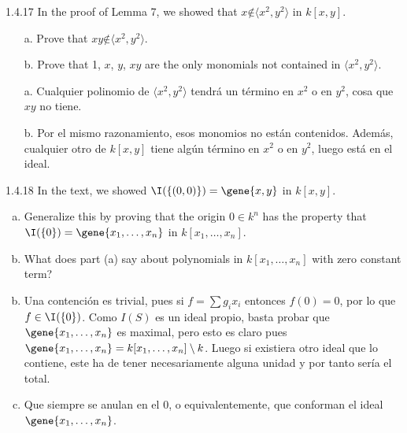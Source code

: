 \documentclass[twoside]{article}
\begin{document}
\newpage

\begin{ejercicio}{1.4.17}
In the proof of Lemma 7, we showed that $x \not∈ 
\langle x^2, y^2\rangle$ in $k[x, y]$.
\begin{itemize}
\item[a.] Prove that $xy \not∈ 
\langle x^2, y^2\rangle$.
\item[b.] Prove that 1, $x$, $y$, $xy$ are the only monomials not contained in 
$\langle x^2, y^2\rangle$.
\end{itemize}
\end{ejercicio}
\begin{solucion}
\begin{itemize}
\item[]
\item[a.] Cualquier polinomio de $\langle x^2, y^2\rangle$ tendrá un término en $x^2$ o en $y^2$, cosa que $xy$ no tiene. 
\item[b.] Por el mismo razonamiento, esos monomios no están contenidos. Además, cualquier otro de $k[x,y]$ tiene algún término en $x^2$ o en $y^2$, luego está en el ideal. 
\end{itemize}
\end{solucion}

\newpage

\begin{ejercicio}{1.4.18}
In the text, we showed $\I(\{(0,0)\}) = \gene{x,y}$ in $k[x,y]$. 
\begin{enumerate}[a.]
\item Generalize this by proving that the origin $0\in k^n$ has the property that $\I(\{0\}) = \gene{x_1,\dotsc,x_n}$ in $k[x_1,\dotsc,x_n]$.
\item What does part (a) say about polynomials in $k[x_1,\dotsc,x_n]$ with zero constant term?
\end{enumerate}
\end{ejercicio}
\begin{solucion}
\begin{enumerate}[a.]
\item[]
\item Una contención es trivial, pues si $f= \sum g_i x_i$ entonces  $f(0)=0$, por lo que $f\in \I(\{0\})$. Como $I(S)$ es un ideal propio, basta probar que $\gene{x_1,\dotsc,x_n}$ es maximal, pero esto es claro pues $\gene{x_1,\dotsc,x_n} = k[x_1,\dotsc,x_n]\setminus k$. Luego si existiera otro ideal que lo contiene, este ha de tener necesariamente alguna unidad y por tanto sería el total.
\item Que siempre se anulan en el 0, o equivalentemente, que conforman el ideal $\gene{x_1,\dotsc,x_n}$.

\end{enumerate}
\end{solucion}
\newpage
\end{document}
